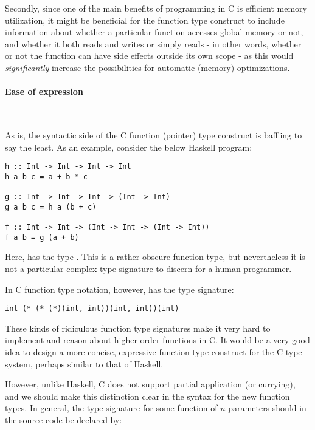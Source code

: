 Secondly, since one of the main benefits of programming in C is efficient memory
utilization, it might be beneficial for the function type construct to include
information about whether a particular function accesses global memory or not,
and whether it both reads and writes or simply reads - in other words, whether
or not the function can have side effects outside its own scope - as this would
\emph{significantly} increase the possibilities for automatic (memory)
optimizations.


\paragraph{Ease of expression}~\smallskip

As is, the syntactic side of the C function (pointer) type construct is baffling
to say the least. As an example, consider the below Haskell program:

\begin{verbatim}
h :: Int -> Int -> Int -> Int
h a b c = a + b * c

g :: Int -> Int -> Int -> (Int -> Int)
g a b c = h a (b + c)

f :: Int -> Int -> (Int -> Int -> (Int -> Int))
f a b = g (a + b)
\end{verbatim}

Here,  has the type .
This is a rather obscure function type, but nevertheless it is not a
particular complex type signature to discern for a human programmer.

\medskip

In C function type notation, however,  has the type signature:

\begin{verbatim}
int (* (* (*)(int, int))(int, int))(int)
\end{verbatim}

These kinds of ridiculous function type signatures make it very hard to
implement and reason about higher-order functions in C. It would be a very good
idea to design a more concise, expressive function type construct for the C type
system, perhaps similar to that of Haskell. 

\smallskip

However, unlike Haskell, C does not support partial application (or currying),
and we should make this distinction clear in the syntax for the new function
types. In general, the type signature for some function  of $n$ parameters
should in the source code be declared by:

